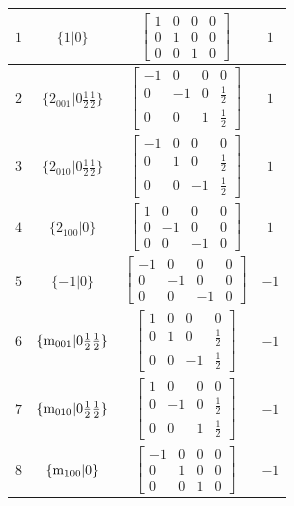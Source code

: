 \documentclass[fleqn,8pt]{jsarticle}
\begin{document}
\begin{longtable}{cccc}
$ 1 $ & $ \{1|0\} $ & $ \begin{bmatrix} 1 & 0 & 0 & 0 \\ 0 & 1 & 0 & 0 \\ 0 & 0 & 1 & 0 \end{bmatrix} $ & $ 1 $ \\ \hline
$ 2 $ & $ \{2{}_{001}|0 \frac{1}{2} \frac{1}{2}\} $ & $ \begin{bmatrix} -1 & 0 & 0 & 0 \\ 0 & -1 & 0 & \frac{1}{2} \\ 0 & 0 & 1 & \frac{1}{2} \end{bmatrix} $ & $ 1 $ \\ \hline
$ 3 $ & $ \{2{}_{010}|0 \frac{1}{2} \frac{1}{2}\} $ & $ \begin{bmatrix} -1 & 0 & 0 & 0 \\ 0 & 1 & 0 & \frac{1}{2} \\ 0 & 0 & -1 & \frac{1}{2} \end{bmatrix} $ & $ 1 $ \\ \hline
$ 4 $ & $ \{2{}_{100}|0\} $ & $ \begin{bmatrix} 1 & 0 & 0 & 0 \\ 0 & -1 & 0 & 0 \\ 0 & 0 & -1 & 0 \end{bmatrix} $ & $ 1 $ \\ \hline
$ 5 $ & $ \{-1|0\} $ & $ \begin{bmatrix} -1 & 0 & 0 & 0 \\ 0 & -1 & 0 & 0 \\ 0 & 0 & -1 & 0 \end{bmatrix} $ & $ -1 $ \\ \hline
$ 6 $ & $ \{{\rm m}_{001}|0 \frac{1}{2} \frac{1}{2}\} $ & $ \begin{bmatrix} 1 & 0 & 0 & 0 \\ 0 & 1 & 0 & \frac{1}{2} \\ 0 & 0 & -1 & \frac{1}{2} \end{bmatrix} $ & $ -1 $ \\ \hline
$ 7 $ & $ \{{\rm m}_{010}|0 \frac{1}{2} \frac{1}{2}\} $ & $ \begin{bmatrix} 1 & 0 & 0 & 0 \\ 0 & -1 & 0 & \frac{1}{2} \\ 0 & 0 & 1 & \frac{1}{2} \end{bmatrix} $ & $ -1 $ \\ \hline
$ 8 $ & $ \{{\rm m}_{100}|0\} $ & $ \begin{bmatrix} -1 & 0 & 0 & 0 \\ 0 & 1 & 0 & 0 \\ 0 & 0 & 1 & 0 \end{bmatrix} $ & $ -1 $ \\
\end{longtable}
\end{document}
